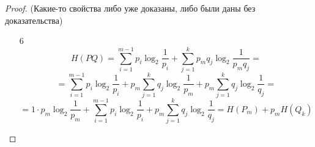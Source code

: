 \begin{proof} (Какие-то свойства либо уже доказаны, либо были даны без доказательства)
    \begin{enumerate}
        \item[6]
        \[H(PQ) = \sum_{i=1}^{m-1}p_i \log_2 \frac{1}{p_i} + \sum_{j=1}^{k} p_m q_j \log_2 \frac{1}{p_m q_j} =\]
        \[= \sum_{i=1}^{m-1}p_i \log_2 \frac{1}{p_i} + p_m \sum_{j=1}^{k}q_j \log_2 \frac{1}{p_m} + p_m \sum_{j=1}^{k}q_j \log_2 \frac{1}{q_j} = \]
        \[= 1 \cdot p_m \log_2 \frac{1}{p_m} +  \sum_{i=1}^{m-1}p_i \log_2 \frac{1}{p_i} + p_m \sum_{j=1}^{k}q_j \log_2 \frac{1}{q_j} = H(P_m) + p_m H(Q_k)\]
    \end{enumerate}
\end{proof}